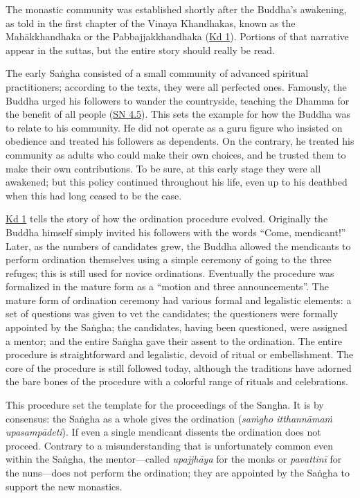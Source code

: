 \documentclass[12pt,openany]{book}%
\begin{document}
The monastic community was established shortly after the Buddha’s awakening, as told in the first chapter of the Vinaya Khandhakas, known as the \textsanskrit{Mahākkhandhaka} or the Pabbajjakkhandhaka (\href{https://suttacentral.net/pli{-}tv{-}kd1}{Kd 1}). Portions of that narrative appear in the suttas, but the entire story should really be read.

The early \textsanskrit{Saṅgha} consisted of a small community of advanced spiritual practitioners; according to the texts, they were all perfected ones. Famously, the Buddha urged his followers to wander the countryside, teaching the Dhamma for the benefit of all people (\href{https://suttacentral.net/sn4.5}{SN 4.5}). This sets the example for how the Buddha was to relate to his community. He did not operate as a guru figure who insisted on obedience and treated his followers as dependents. On the contrary, he treated his community as adults who could make their own choices, and he trusted them to make their own contributions. To be sure, at this early stage they were all awakened; but this policy continued throughout his life, even up to his deathbed when this had long ceased to be the case.

\href{https://suttacentral.net/pli{-}tv{-}kd1}{Kd 1} tells the story of how the ordination procedure evolved. Originally the Buddha himself simply invited his followers with the words “Come, mendicant!” Later, as the numbers of candidates grew, the Buddha allowed the mendicants to perform ordination themselves using a simple ceremony of going to the three refuges; this is still used for novice ordinations. Eventually the procedure was formalized in the mature form as a “motion and three announcements”. The mature form of ordination ceremony had various formal and legalistic elements: a set of questions was given to vet the candidates; the questioners were formally appointed by the \textsanskrit{Saṅgha}; the candidates, having been questioned, were assigned a mentor; and the entire \textsanskrit{Saṅgha} gave their assent to the ordination. The entire procedure is straightforward and legalistic, devoid of ritual or embellishment. The core of the procedure is still followed today, although the traditions have adorned the bare bones of the procedure with a colorful range of rituals and celebrations.

This procedure set the template for the proceedings of the Sangha. It is by consensus: the \textsanskrit{Saṅgha} as a whole gives the ordination (\emph{\textsanskrit{saṁgho} \textsanskrit{itthannāmaṁ} \textsanskrit{upasampādeti}}). If even a single mendicant dissents the ordination does not proceed. Contrary to a misunderstanding that is unfortunately common even within the \textsanskrit{Saṅgha}, the mentor—called \textit{\textsanskrit{upajjhāya}} for the monks or \textit{\textsanskrit{pavattinī}} for the nuns—does not perform the ordination; they are appointed by the \textsanskrit{Saṅgha} to support the new monastics.
\end{document}
